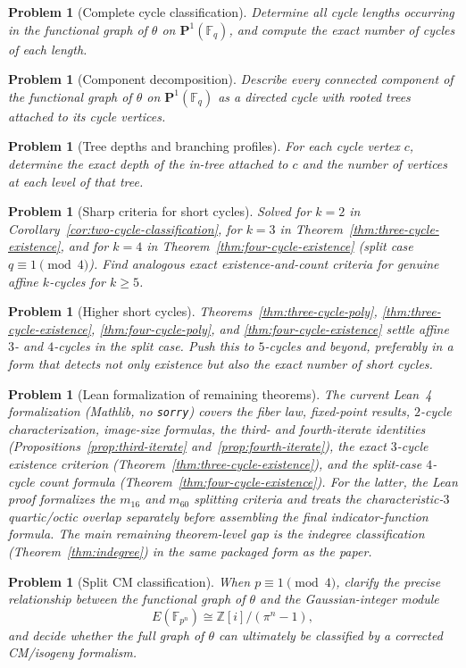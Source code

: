 \documentclass[11pt]{article}
\newtheorem{problem}[theorem]{Problem}
\newcommand{\F}{\mathbb{F}}
\newcommand{\Pone}{\mathbf{P}^1}
\begin{document}
\begin{problem}[Complete cycle classification]
Determine all cycle lengths occurring in the functional graph of $\theta$ on $\Pone(\F_q)$, and compute the exact number of cycles of each length.
\end{problem}

\begin{problem}[Component decomposition]
Describe every connected component of the functional graph of $\theta$ on $\Pone(\F_q)$ as a directed cycle with rooted trees attached to its cycle vertices.
\end{problem}

\begin{problem}[Tree depths and branching profiles]
For each cycle vertex $c$, determine the exact depth of the in-tree attached to $c$ and the number of vertices at each level of that tree.
\end{problem}

\begin{problem}[Sharp criteria for short cycles]
\emph{Solved for $k=2$ in Corollary~\ref{cor:two-cycle-classification}, for $k=3$ in Theorem~\ref{thm:three-cycle-existence}, and for $k=4$ in Theorem~\ref{thm:four-cycle-existence} (split case $q\equiv 1\pmod4$).}
Find analogous exact existence-and-count criteria for genuine affine $k$-cycles for $k\geq 5$.
\end{problem}

\begin{problem}[Higher short cycles]
Theorems~\ref{thm:three-cycle-poly}, \ref{thm:three-cycle-existence}, \ref{thm:four-cycle-poly}, and \ref{thm:four-cycle-existence} settle affine $3$- and $4$-cycles in the split case.
Push this to $5$-cycles and beyond, preferably in a form that detects not only existence but also the exact number of short cycles.
\end{problem}

\begin{problem}[Lean formalization of remaining theorems]
The current Lean~4 formalization (Mathlib, no \texttt{sorry}) covers the fiber law, fixed-point results, $2$-cycle characterization, image-size formulas, the third- and fourth-iterate identities (Propositions~\ref{prop:third-iterate} and~\ref{prop:fourth-iterate}), the exact $3$-cycle existence criterion (Theorem~\ref{thm:three-cycle-existence}), and the split-case $4$-cycle count formula (Theorem~\ref{thm:four-cycle-existence}).
For the latter, the Lean proof formalizes the $m_{16}$ and $m_{60}$ splitting criteria and treats the characteristic-$3$ quartic/octic overlap separately before assembling the final indicator-function formula.
The main remaining theorem-level gap is the indegree classification (Theorem~\ref{thm:indegree}) in the same packaged form as the paper.
\end{problem}

\begin{problem}[Split CM classification]
When $p\equiv 1\pmod4$, clarify the precise relationship between the functional graph of $\theta$ and the Gaussian-integer module
\[
E(\F_{p^n})\cong \mathbb{Z}[i]/(\pi^n-1),
\]
and decide whether the full graph of $\theta$ can ultimately be classified by a corrected CM/isogeny formalism.
\end{problem}
\end{document}
